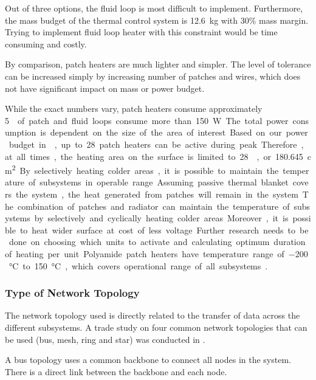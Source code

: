 Out of three options, the fluid loop is most difficult to implement. Furthermore, the mass budget of the thermal control system is \SI{12.6}{\kilo\gram} with 30\% mass margin. Trying to implement fluid loop heater with this constraint would be time consuming and costly.

By comparison, patch heaters are much lighter and simpler. The level of tolerance can be increased simply by increasing number of patches and wires, which does not have significant impact on mass or power budget.

While the exact numbers vary, patch heaters consume approximately \SI{5}{\watt\per{}} of patch and fluid loops consume more than \SI{150}{\watt}. The total power consumption is dependent on the size of the area of interest. 

Based on our power budget in , up to 28 patch heaters can be active during peak. Therefore, at all times, the heating area on the surface is limited to \SI{28}{}, or \SI{180.645}{\square\centi\metre}. By selectively heating colder areas, it is possible to maintain the temperature of subsystems in operable range.  Assuming passive thermal blanket covers the system, the heat generated from patches will remain in the system. The combination of patches and radiator can maintain the temperature of subsystems by selectively and cyclically heating colder areas. Moreover, it is possible to heat wider surface at cost of less voltage. Further research needs to be done on choosing which units to activate and calculating optimum duration of heating per unit. Polyamide patch heaters have temperature range of \SI{-200}{\degreeCelsius} to \SI{150}{\degreeCelsius}, which covers operational range of all subsystems \cite{heater_design}.

\subsubsection{Type of Network Topology}
\label{sect:network_to}
The network topology used is directly related to the transfer of data across the different subsystems. A trade study on four common network topologies that can be used (bus, mesh, ring and star) was conducted in .

A bus topology uses a common backbone to connect all nodes in the system. There is a direct link between the backbone and each node. 

